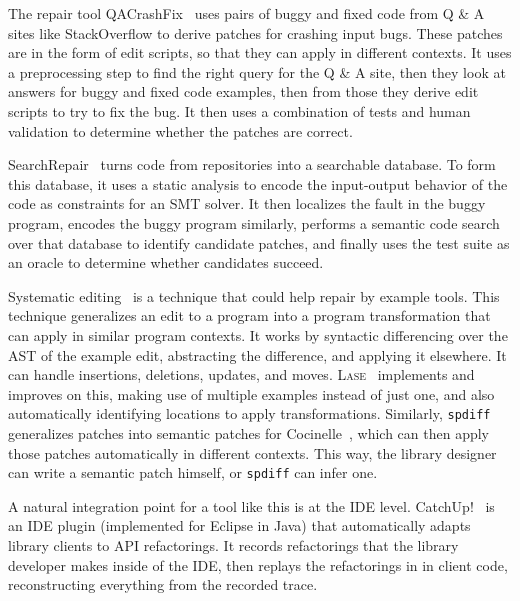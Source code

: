 The repair tool QACrashFix~\cite{gao2015fixing} uses pairs of buggy and fixed code from Q \& A sites like
StackOverflow to derive patches for crashing input bugs. These patches are in the form of edit scripts,
so that they can apply in different contexts. %
It uses a preprocessing step to find the right query for the Q \& A site, then they
look at answers for buggy and fixed code examples, then from those they derive edit scripts to try to fix the bug.
It then uses a combination of tests and human validation to determine whether the patches are correct. %

SearchRepair~\cite{Ke:2015:RPS:2916135.2916260} turns code from repositories into a searchable database.
To form this database, it uses a static analysis to encode the input-output behavior of the code as constraints for an SMT solver.
It then localizes the fault in the buggy program,
encodes the buggy program similarly, performs a semantic code search over that database to identify candidate patches,
and finally uses the test suite as an oracle to determine whether candidates succeed. %

Systematic editing~\cite{meng2011systematic} is a technique that could help repair by example tools.
This technique generalizes an edit to a program into a program transformation that can apply in similar program contexts.
It works by syntactic differencing over the AST of the example edit, abstracting the difference, and applying it elsewhere.
It can handle insertions, deletions, updates, and moves.
\textsc{Lase}~\cite{meng2013lase} implements and improves on this,
making use of multiple examples instead of just one, %
and also automatically identifying locations to apply transformations.
Similarly, \lstinline{spdiff}~\cite{andersen2010generic} generalizes patches into semantic patches for Cocinelle~\cite{padioleau2008documenting},
which can then apply those patches automatically in different contexts. This way, the library designer can write a semantic patch
himself, or \lstinline{spdiff} can infer one.

A natural integration point for a tool like this is at the IDE level. %
CatchUp!~\cite{Henkel:2005:CCR:1062455.1062512} is an IDE plugin (implemented for Eclipse in Java) that automatically adapts library clients to API refactorings.
It records refactorings that the library developer makes inside of the IDE,
then replays the refactorings in in client code, reconstructing everything from the recorded trace. %

